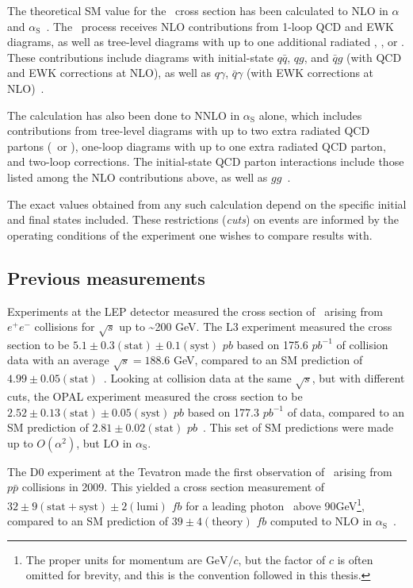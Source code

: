 \documentclass[oneside, letterpaper, 12pt, oldfontcommands]{memoir}
\begin{document}
The theoretical SM value for the \zinvg\ cross section has been calculated to NLO in $\alpha$ and $\alpha_\mathrm{S}$~\cite{ref:JHEP04(2015)018, ref:JHEP02(2016)057}.
The \zinvg\ process receives NLO contributions from 1-loop QCD and EWK diagrams, as well as tree-level diagrams with up to one additional radiated \Pgamma, \Pq, or \Pg.
These contributions include diagrams with initial-state $q\bar{q}$, $qg$, and $\bar{q}g$ (with QCD and EWK corrections at NLO), as well as $q\gamma$, $\bar{q}\gamma$ (with EWK corrections
at NLO)~\cite{ref:JHEP02(2016)057}.

The calculation has also been done to NNLO in $\alpha_\mathrm{S}$ alone,
which includes contributions from tree-level diagrams with up to two extra radiated QCD partons (\Pq\ or \Pg), one-loop diagrams with up to one extra
radiated QCD parton, and two-loop corrections. The initial-state QCD parton interactions include those listed among the NLO contributions above,
as well as $gg$~\cite{ref:j.physletb.2014.02.037, ref:JHEP07(2015)085}.

The exact values obtained from any such calculation depend on the specific initial and final states included. These restrictions (\textit{cuts}) on events are
informed by the operating conditions of the experiment one wishes to compare results with.

\subsection{Previous measurements} \label{sec:introduction_znng_previous_measurements}
Experiments at the LEP detector measured the cross section of \zinvg\ arising from $e^{\mathrm{+}}e^{\mathrm{-}}$ collisions for $\sqrt{s}$ up to \textasciitilde200 GeV.
The L3 experiment measured the cross section to be $5.1 \pm 0.3\mathrm{(stat)} \pm 0.1\mathrm{(syst)}$ $pb$ based on 175.6 $pb^{-1}$ of collision data with an average $\sqrt{s} = 188.6$ GeV, compared to an SM
prediction of $4.99 \pm 0.05\mathrm{(stat)}$~\cite{ref:j.physletb.2004.07.002}. Looking at collision data at the same $\sqrt{s}$, but with different cuts,
the OPAL experiment measured the cross section to be $2.52 \pm 0.13\mathrm{(stat)} \pm 0.05\mathrm{(syst)}$ $pb$ based on 177.3 $pb^{-1}$ of data, compared to an SM
prediction of $2.81 \pm 0.02\mathrm{(stat)}$ $pb$~\cite{}. This set of SM predictions were made up to $O(\alpha^2)$, but LO in $\alpha_\mathrm{S}$.

The D0 experiment at the Tevatron made the first observation of \zinvg\ arising from $p\bar{p}$ collisions in 2009. This yielded a cross section measurement of
$32 \pm 9\mathrm{(stat+syst)} \pm 2\mathrm{(lumi)}$ $fb$ for a leading photon \pT\ above 90\unit{GeV}\footnote{The proper units for momentum are $\mathrm{GeV}/c$, but the
factor of $c$ is often omitted for brevity, and this is the convention followed in this thesis.},
compared to an SM prediction of $39 \pm 4\mathrm{(theory)}$ $fb$ computed to NLO in $\alpha_\mathrm{S}$~\cite{ref:PhysRevLett.102.201802}.
\end{document}

